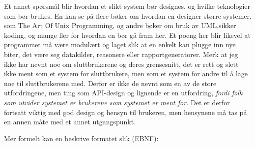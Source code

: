 \documentclass[11pt]{article}
\begin{document}
Et annet spørsmål blir hvordan et slikt system bør designes, og hvilke teknologier som bør brukes. En kan se på flere bøker om hvordan en designer større systemer, som The Art Of Unix Programming\cite{taoup}, og andre bøker om bruk av UML\cite{umlpatterns},sikker koding\cite{certguide}, og mange fler for hvordan en bør gå fram her. Et poeng her blir likevel at programmet må være modulært og laget slik at en enkelt kan plugge inn nye biter, det være seg datakilder, reasonere eller rapportgeneratorer. Merk at jeg ikke har nevnt noe om sluttbrukerene og deres grensesnitt, det er rett og slett ikke ment som et system for sluttbrukere, men som et system for andre til å lage noe til sluttbrukerene med. Derfor er ikke de nevnt som en av de store utfordringene, men ting som API-design og lignende er en utfordring, \emph{fordi folk som utvider systemet er brukerene som systemet er ment for.} Det er derfor fortsatt viktig med god design og hensyn til brukeren, men hensynene må tas på en annen måte med et annet utgangspunkt.

Mer formelt kan en beskrive formatet slik (EBNF):
\end{document}
